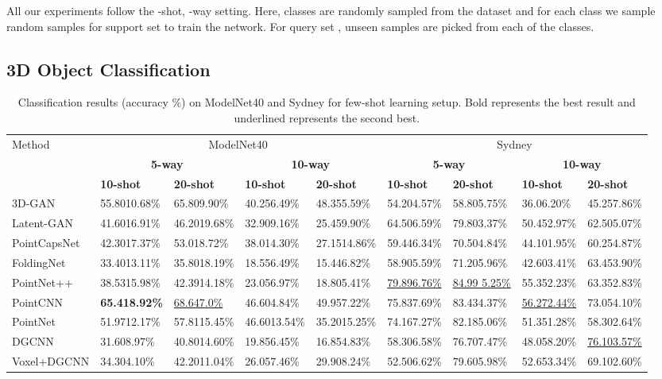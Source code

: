 \documentclass{article}
\begin{document}
 All our experiments follow the -shot, -way setting. Here,  classes are randomly sampled from the dataset and for each class we sample  random samples for support set  to train the network. For query set , unseen samples are picked from each of the  classes.


\subsection{3D Object Classification}
\begin{table}[tbp]
	\caption{Classification results (accuracy \%) on ModelNet40 and Sydney for few-shot learning setup. Bold represents the best result and underlined represents the second best. }
	\label{Classification}
	\centering
	\tiny
	\setlength{\tabcolsep}{2.5pt}
	\begin{tabular}{lllllllll}
		\toprule
		Method & \multicolumn{4}{c}{ModelNet40} & \multicolumn{4}{c}{Sydney}\\
		\cmidrule(r){2-9}
		& \multicolumn{2}{c}{\textbf{5-way}} & \multicolumn{2}{c}{\textbf{10-way}}& \multicolumn{2}{c}{\textbf{5-way}}& \multicolumn{2}{c}{\textbf{10-way}}\\
		\cmidrule(r){2-9}
		& \textbf{10-shot} & \textbf{20-shot} & \textbf{10-shot} & \textbf{20-shot} & \textbf{10-shot} & \textbf{20-shot} & \textbf{10-shot} & \textbf{20-shot}\\
		\midrule
		
3D-GAN &  55.8010.68\% &  65.809.90\% & 40.256.49\% & 48.355.59\% &  54.204.57\% & 58.805.75\% & 36.06.20\%&45.257.86\%\\
		Latent-GAN & 41.6016.91\%&  46.2019.68\% & 32.909.16\% & 25.459.90\% &  64.506.59\% & 79.803.37\% &50.452.97\% &62.505.07\% \\
		PointCapsNet & 42.3017.37\% &  53.018.72\% &38.014.30\% & 27.1514.86\%  &  59.446.34\% &  70.504.84\% &44.101.95\%&60.254.87\%\\
		FoldingNet & 33.4013.11\% &  35.8018.19\% & 18.556.49\% & 15.446.82\% & 58.905.59\% &  71.205.96\% &42.603.41\%&63.453.90\%\\
		PointNet++ & 38.5315.98\% & 42.3914.18\%&  23.056.97\% & 18.805.41\% & \underline{79.896.76\%} & \underline{84.99 5.25\%}  & 55.352.23\% & 63.352.83\% \\
		PointCNN & \textbf{65.418.92\%} &  \underline{68.647.0\%} & 46.604.84\% &49.957.22\% & 75.837.69\% & 83.434.37\%&\underline{56.272.44\%}&73.054.10\% \\
		PointNet & 51.9712.17\% & 57.8115.45\% & 46.6013.54\% & 35.2015.25\% & 74.167.27\% & 82.185.06\% & 51.351.28\% & 58.302.64\% \\
		DGCNN & 31.608.97\%& 40.8014.60\%& 19.856.45\%& 16.854.83\%& 58.306.58\%& 76.707.47\%& 48.058.20\%&\underline{76.103.57\%}\\
		Voxel+DGCNN & 34.304.10\% & 42.2011.04\%& 26.057.46\%& 29.908.24\%& 52.506.62\%& 79.605.98\%&52.653.34\%&69.102.60\%\\
		\midrule
		

\end{tabular}
\end{table}
\end{document}
